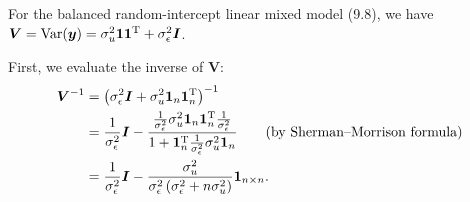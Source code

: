 \documentclass[a4paper]{article}
\newcommand{\Var}{\mathrm{Var}}
\begin{document}
For the balanced random-intercept linear mixed model (9.8), we have $\bm{V} = \Var(\bm{y}) = \sigma_{u}^{2}\bm{1}\bm{1}^{\rm T} + \sigma_{\epsilon}^{2}\bm{I}$.

First, we evaluate the inverse of $\bm{V}$:
\begin{align*}
\bm{V}^{-1} &= \left(\sigma_{\epsilon}^{2}\bm{I} + \sigma_{u}^{2}\bm{1}_{n}\bm{1}_{n}^{\rm T}\right)^{-1}\\
&= \frac{1}{\sigma_{\epsilon}^{2}}\bm{I} -\frac{
\frac{1}{\sigma_{\epsilon}^{2}}\sigma_{u}^{2}\bm{1}_{n}\bm{1}_{n}^{\rm T}\frac{1}{\sigma_{\epsilon}^{2}}}{1+\bm{1}_{n}^{\rm T}\frac{1}{\sigma_{\epsilon}^{2}}\sigma_{u}^{2}\bm{1}_{n}}\tag{\mbox{by Sherman--Morrison formula}}\\
&= \frac{1}{\sigma_{\epsilon}^{2}}\bm{I} -\frac{\sigma_{u}^{2}}{\sigma_{\epsilon}^{2}\left(\sigma_{\epsilon}^{2}+n\sigma_{u}^{2}\right)}\bm{1}_{n \times n}.
\end{align*}
\end{document}
